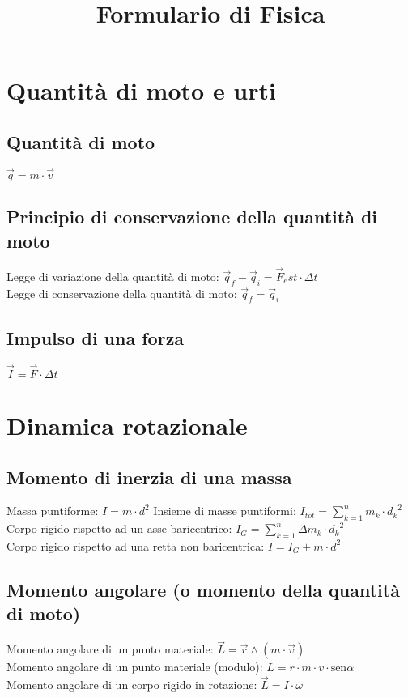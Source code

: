 \documentclass[a4paper,12pt]{article}
\title{Formulario di Fisica}
\date{\vspace{-5ex}}
\author{\vspace{-5ex}}
\newcommand{\sen}{\textrm{sen}}
\begin{document}
\maketitle
\section{Quantità di moto e urti}
    \subsection{Quantità di moto}
        $\vec{q}=m \cdot \vec{v}$
    \subsection{Principio di conservazione della quantità di moto}
        Legge di variazione della quantità di moto: $\vec{q}_f-\vec{q}_i=\vec{F}_est \cdot \Delta t$\\
        Legge di conservazione della quantità di moto: $\vec{q}_f=\vec{q}_i$\\
    \subsection{Impulso di una forza}
        $\vec{I}=\vec{F}\cdot \Delta t$
\section{Dinamica rotazionale}
    \subsection{Momento di inerzia di una massa}
        Massa puntiforme: $I=m\cdot d^2$
        Insieme di masse puntiformi: $I_{tot}=\displaystyle\sum_{k=1}^{n} m_k\cdot {d_k}^2$\\
        Corpo rigido rispetto ad un asse baricentrico: $I_G=\displaystyle\sum_{k=1}^{n} \Delta m_k\cdot {d_k}^2$\\
        Corpo rigido rispetto ad una retta non baricentrica: $I=I_G + m\cdot d^2$\\
    \subsection{Momento angolare (o momento della quantità di moto)}
        Momento angolare di un punto materiale: $\vec{L}=\vec{r}\wedge(m\cdot \vec{v})$\\
        Momento angolare di un punto materiale (modulo): $L=r\cdot m \cdot v\cdot\sen\alpha$\\
        Momento angolare di un corpo rigido in rotazione: $\vec{L}=I \cdot\omega$
\end{document}
